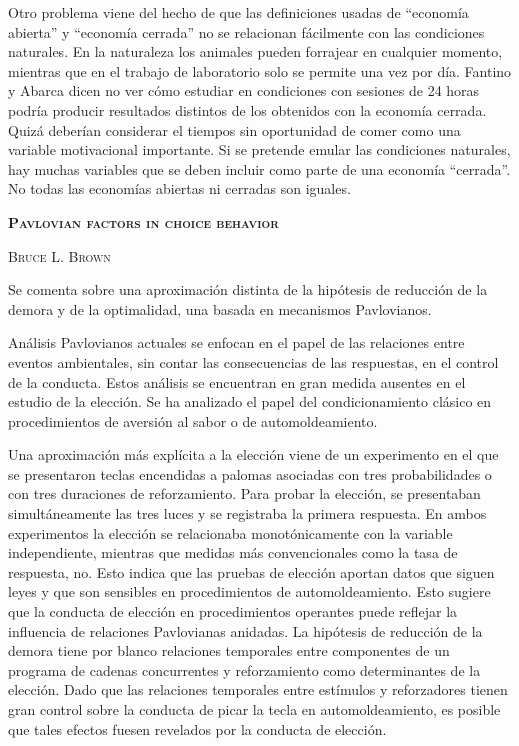 \documentclass[a4paper,12pt]{article}
\begin{document}
Otro problema viene del hecho de que las definiciones usadas de ``economía abierta'' y ``economía cerrada'' no se relacionan fácilmente con las condiciones naturales. En la naturaleza los animales pueden forrajear en cualquier momento, mientras que en el trabajo de laboratorio solo se permite una vez por día. Fantino y Abarca dicen no ver cómo estudiar en condiciones con sesiones de 24 horas podría producir resultados distintos de los obtenidos con la economía cerrada. Quizá deberían considerar el tiempos sin oportunidad de comer como una variable motivacional importante. Si se pretende emular las condiciones naturales, hay muchas variables que se deben incluir como parte de una economía ``cerrada''. No todas las economías abiertas ni cerradas son iguales.

{\scshape\bfseries Pavlovian factors in choice behavior}

{\scshape Bruce L. Brown}

Se comenta sobre una aproximación distinta de la hipótesis de reducción de la demora y de la optimalidad, una basada en mecanismos Pavlovianos.

Análisis Pavlovianos actuales se enfocan en el papel de las relaciones entre eventos ambientales, sin contar las consecuencias de las respuestas, en el control de la conducta. Estos análisis se encuentran en gran medida ausentes en el estudio de la elección. Se ha analizado el papel del condicionamiento clásico en procedimientos de aversión al sabor o de automoldeamiento.

Una aproximación más explícita a la elección viene de un experimento en el que se presentaron teclas encendidas a palomas asociadas con tres probabilidades o con tres duraciones de reforzamiento. Para probar la elección, se presentaban simultáneamente las tres luces y se registraba la primera respuesta. En ambos experimentos la elección se relacionaba monotónicamente con la variable independiente, mientras que medidas más convencionales como la tasa de respuesta, no. Esto indica que las pruebas de elección aportan datos que siguen leyes y que son sensibles en procedimientos de automoldeamiento. Esto sugiere que la conducta de elección en procedimientos operantes puede reflejar la influencia de relaciones Pavlovianas anidadas. La hipótesis de reducción de la demora tiene por blanco relaciones temporales entre componentes de un programa de cadenas concurrentes y reforzamiento como determinantes de la elección. Dado que las relaciones temporales entre estímulos y reforzadores tienen gran control sobre la conducta de picar la tecla en automoldeamiento, es posible que tales efectos fuesen revelados por la conducta de elección. 
\end{document}
